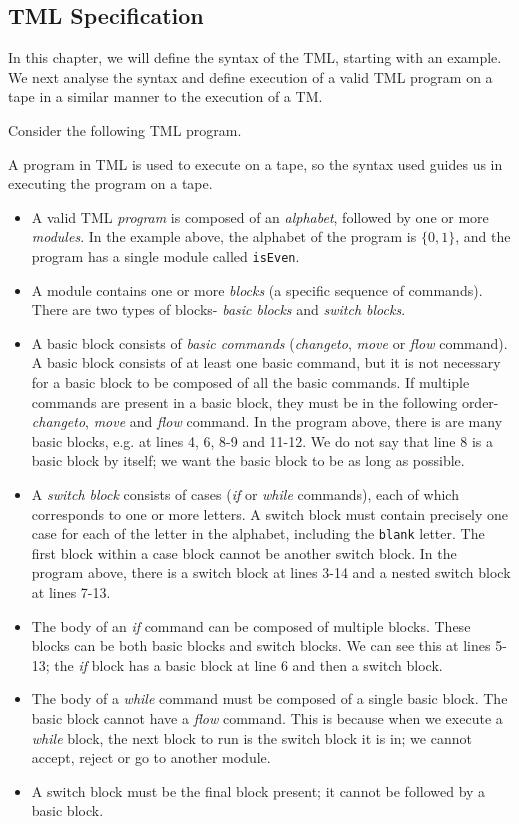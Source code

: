 \begin{appendices}
\chapter{TML Specification}

In this chapter, we will define the syntax of the TML, starting with an example. We next analyse the syntax and define execution of a valid TML program on a tape in a similar manner to the execution of a TM.

Consider the following TML program.

A program in TML is used to execute on a tape, so the syntax used guides us in executing the program on a tape. 
\begin{itemize}
    \item A valid TML \emph{program} is composed of an \emph{alphabet}, followed by one or more \emph{modules}. In the example above, the alphabet of the program is $\{0, 1\}$, and the program has a single module called \texttt{isEven}.
    \item A module contains one or more \emph{blocks} (a specific sequence of commands). There are two types of blocks- \emph{basic blocks} and \emph{switch blocks}.
    \item A basic block consists of \emph{basic commands} (\textit{changeto}, \textit{move} or \textit{flow} command). A basic block consists of at least one basic command, but it is not necessary for a basic block to be composed of all the basic commands. If multiple commands are present in a basic block, they must be in the following order- \textit{changeto}, \textit{move} and \textit{flow} command. In the program above, there is are many basic blocks, e.g. at lines 4, 6, 8-9 and 11-12. We do not say that line 8 is a basic block by itself; we want the basic block to be as long as possible.
    \item A \emph{switch block} consists of cases (\textit{if} or \textit{while} commands), each of which corresponds to one or more letters. A switch block must contain precisely one case for each of the letter in the alphabet, including the \texttt{blank} letter. The first block within a case block cannot be another switch block. In the program above, there is a switch block at lines 3-14 and a nested switch block at lines 7-13.
    \item The body of an \textit{if} command can be composed of multiple blocks. These blocks can be both basic blocks and switch blocks. We can see this at lines 5-13; the \textit{if} block has a basic block at line 6 and then a switch block.
    \item The body of a \textit{while} command must be composed of a single basic block. The basic block cannot have a \textit{flow} command. This is because when we execute a \textit{while} block, the next block to run is the switch block it is in; we cannot accept, reject or go to another module.
    \item A switch block must be the final block present; it cannot be followed by a basic block.
\end{itemize}


\end{appendices}
